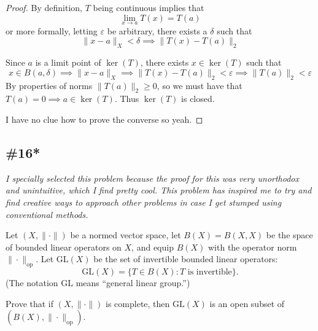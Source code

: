 \documentclass{article}
\newcommand{\op}{\mathrm{op}}
\newcommand{\GL}{\mathrm{GL}}
\theoremstyle{plain} %
\numberwithin{thm}{section} %
\theoremstyle{definition}
\begin{document}
\begin{enumerate}[label=(\alph*)]
\begin{proof}
                By definition, \(T\) being continuous implies that
                \[
                    \lim_{x \to a} T(x) = T(a)
                \]
                or more formally, letting \(\varepsilon\) be arbitrary, there exists a \(\delta\) such that
                \[
                    \|x - a\| _X < \delta \implies \|T(x) - T(a)\| _2
                \]

                Since \(a\) is a limit point of \(\ker (T)\), there exists \(x \in \ker (T)\) such that
                \[
                    x \in B(a, \delta) \implies \|x -a\| _X \implies \|T(x)-T(a)\| _2 < \varepsilon \implies \|T(a)\| _2 < \varepsilon
                \]
                By properties of norms \(\|T(a)\| _2 \geq 0\), so we must have that \(T(a) = 0 \implies a \in \ker (T)\). Thus \(\ker(T)\) is closed.

                I have no clue how to prove the converse so yeah.

            \end{proof}
        \end{enumerate}

        \subsection{\#16*}

        \textit{I specially selected this problem because the proof for this was very unorthodox and unintuitive, which I find pretty cool. This problem has inspired me to try and find creative ways to approach other problems in case I get stumped using conventional methods.}

        Let $(X,\|\cdot\|)$ be a normed vector space, let $B(X)=B(X,X)$ be the space of bounded linear operators on $X$, and equip $B(X)$ with the operator norm $\|\cdot\|_{\op}$. Let $\GL(X)$ be the set of invertible bounded linear operators:
        \[ \GL(X) = \{T\in B(X) : \text{$T$ is invertible}\}. \]
        (The notation $\GL$ means ``general linear group.'')
        
        Prove that if $(X,\|\cdot\|)$ is complete, then $\GL(X)$ is an open subset of $(B(X),\|\cdot\|_{\mathrm{op}})$.
        
\end{document}
